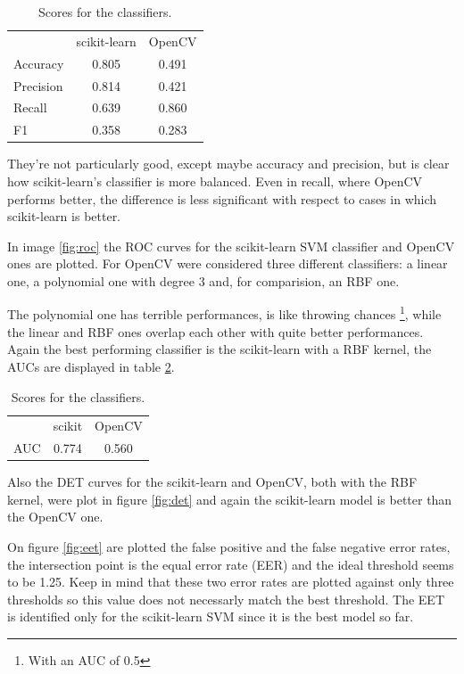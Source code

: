 \begin{table}[h!t]
    \centering
    \caption{Scores for the classifiers.}
    \label{tab:scores}
    \begin{tabular}{lcc}
        & scikit-learn & OpenCV \\
        Accuracy & 0.805 & 0.491 \\
        Precision & 0.814 & 0.421 \\
        Recall & 0.639 & 0.860 \\
        F1 & 0.358 & 0.283 \\
    \end{tabular}
\end{table}

They're not particularly good, except maybe accuracy and precision, but is clear how scikit-learn's classifier is more balanced. 
Even in recall, where OpenCV performs better, the difference is less significant with respect to cases in which scikit-learn is better.

In image \ref{fig:roc} the ROC curves for the scikit-learn SVM classifier and OpenCV ones are plotted.
For OpenCV were considered three different classifiers: a linear one, a polynomial one with degree 3 and, for comparision, an RBF one.

The polynomial one has terrible performances, is like throwing chances \footnote{With an AUC of 0.5}, while the linear and RBF ones overlap each other with quite better performances.
Again the best performing classifier is the scikit-learn with a RBF kernel, the AUCs are displayed in table \ref{tab:auc}.

\begin{table}[h!t]
    \centering
    \caption{Scores for the classifiers.}
    \label{tab:auc}
    \begin{tabular}{lcc}
        & scikit & OpenCV \\
        AUC & 0.774 & 0.560 \\
    \end{tabular}
\end{table}

Also the DET curves for the scikit-learn and OpenCV, both with the RBF kernel, were plot in figure \ref{fig:det} and again the scikit-learn model is better than the OpenCV one.

On figure \ref{fig:eet} are plotted the false positive and the false negative error rates, the intersection point is the equal error rate (EER) and the ideal threshold seems to be 1.25.
Keep in mind that these two error rates are plotted against only three thresholds so this value does not necessarly match the best threshold. 
The EET is identified only for the scikit-learn SVM since it is the best model so far.

